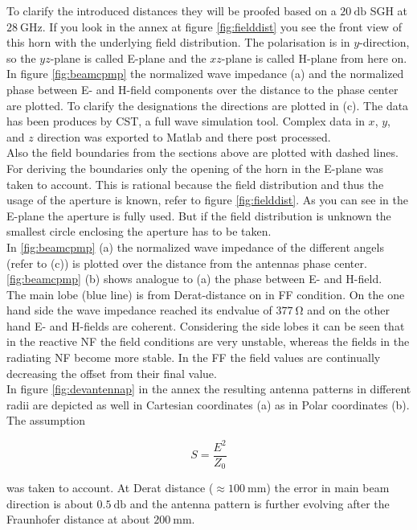 To clarify the introduced distances they will be proofed based on a $\SI{20}{\decibel}$ \ac{SGH} at $\SI{28}{\giga\hertz}$. If you look in the annex at figure \ref{fig:fielddist} you see the front view of this horn with the underlying field distribution. The polarisation is in $y$-direction, so the $yz$-plane is called E-plane and the $xz$-plane is called H-plane from here on.\\
In figure \ref{fig:beamcpmp} the normalized wave impedance (a) and the normalized phase between E- and H-field components over the distance to the phase center are plotted. To clarify the designations the directions are plotted in (c). The data has been produces by CST\texttrademark , a full wave simulation tool. Complex data in $x$, $y$, and $z$ direction was exported to Matlab\texttrademark{ } and there post processed.\\
Also the field boundaries from the sections above are plotted with dashed lines. For deriving the boundaries only the opening of the horn in the E-plane was taken to account. This is rational because the field distribution and thus the usage of the aperture is known, refer to figure \ref{fig:fielddist}. As you can see in the E-plane the aperture is fully used. But if the field distribution is unknown the smallest circle enclosing the aperture has to be taken.\\
In \ref{fig:beamcpmp} (a) the normalized wave impedance of the different angels (refer to (c)) is plotted over the distance from the antennas phase center. \ref{fig:beamcpmp} (b) shows analogue to (a) the phase between E- and H-field.\\
The main lobe (blue line) is from Derat-distance on in \ac{FF} condition. On the one hand side the wave impedance reached its endvalue of $\SI{377}{\ohm}$ and on the other hand E- and H-fields are coherent. Considering the side lobes it can be seen that in the reactive \ac{NF} the field conditions are very unstable, whereas the fields in the radiating \ac{NF} become more stable. In the \ac{FF} the field values are continually decreasing the offset from their final value.\\
In figure \ref{fig:devantennap} in the annex the resulting antenna patterns in different radii are depicted as well in Cartesian coordinates (a) as in Polar coordinates (b). The assumption 

\begin{equation}
S = \frac{E^2}{Z_0}
\end{equation}

was taken to account. At Derat distance ($\approx\SI{100}{\milli\meter}$) the error in main beam direction is about $\SI{0.5}{\decibel}$ and the antenna pattern is further evolving after the Fraunhofer distance at about $\SI{200}{\milli\meter}$.

